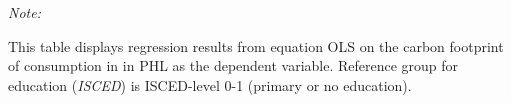 \begin{table}[htbp!]
\begin{adjustbox}{width = 1\textwidth, max height = 0.95\textheight, center}
\begin{threeparttable}[b]
         \begin{tablenotes}\item \medskip \textit{Note:}
            \item This table displays regression results from equation OLS on the carbon footprint of consumption in  in PHL as the dependent variable.  Reference group for education (\textit{ISCED}) is ISCED-level 0-1 (primary or no education).
         \end{tablenotes}
      \end{threeparttable}
   \end{adjustbox}
\end{table}


